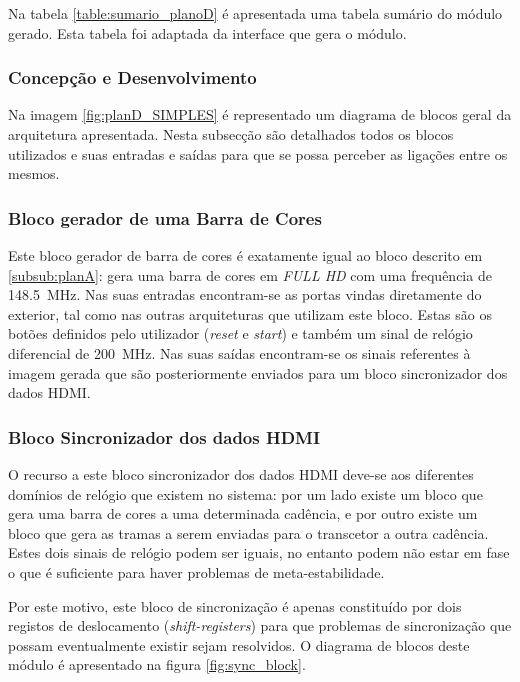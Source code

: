 Na tabela \ref {table:sumario_planoD} é apresentada uma tabela sumário do módulo gerado. Esta tabela foi adaptada da interface que gera o módulo.

\subsubsection{Concepção e Desenvolvimento}

Na imagem \ref{fig:planD_SIMPLES} é representado um diagrama de blocos geral da arquitetura apresentada. Nesta subsecção são detalhados todos os blocos utilizados e suas entradas e saídas para que se possa perceber as ligações entre os mesmos. 

\subsubsection*{Bloco gerador de uma Barra de Cores} \label{subsub:serial_colorBarGenerator}

Este bloco gerador de barra de cores é exatamente igual ao bloco descrito em \ref{subsub:planA}: gera uma barra de cores em \textit{FULL HD} com uma frequência de \SI{148.5}{\mega\hertz}. Nas suas entradas encontram-se as portas vindas diretamente do exterior, tal como nas outras arquiteturas que utilizam este bloco. Estas são os botões definidos pelo utilizador (\textit{reset} e \textit{start}) e também um sinal de relógio diferencial de \SI{200}{\mega\hertz}. Nas suas saídas encontram-se os sinais referentes à imagem gerada que são posteriormente enviados para um bloco sincronizador dos dados HDMI.

\subsubsection*{Bloco Sincronizador dos dados HDMI} \label{subsub:serial_syncsignals}

O recurso a este bloco sincronizador dos dados HDMI deve-se aos diferentes domínios de relógio que existem no sistema: por um lado existe um bloco que gera uma barra de cores a uma determinada cadência, e por outro existe um bloco que gera as tramas a serem enviadas para o transcetor a outra cadência. Estes dois sinais de relógio podem ser iguais, no entanto podem não estar em fase o que é suficiente para haver problemas de meta-estabilidade. 

Por este motivo, este bloco de sincronização é apenas constituído por dois registos de deslocamento (\textit{shift-registers}) para que problemas de sincronização que possam eventualmente existir sejam resolvidos. O diagrama de blocos deste módulo é apresentado na figura \ref{fig:sync_block}. 

